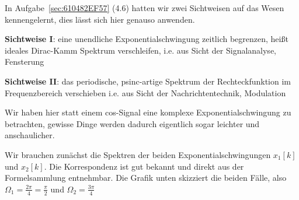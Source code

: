\begin{Ansatz}
In Aufgabe~\ref{sec:610482EF57} (4.6) hatten wir zwei Sichtweisen auf das Wesen kennengelernt, dies
lässt sich hier genauso anwenden.

\textbf{Sichtweise I}: eine unendliche Exponentialschwingung zeitlich
begrenzen, heißt ideales Dirac-Kamm Spektrum verschleifen,
i.e. aus Sicht der Signalanalyse, Fensterung

\textbf{Sichtweise II}: das periodische, psinc-artige Spektrum der Rechteckfunktion
im Frequenzbereich verschieben i.e. aus Sicht der Nachrichtentechnik, Modulation

Wir haben hier statt einem cos-Signal eine komplexe Exponentialschwingung
zu betrachten, gewisse Dinge werden dadurch eigentlich sogar leichter und anschaulicher.

Wir brauchen zunächst die Spektren der beiden Exponentialschwingungen $x_1[k]$
und $x_2[k]$.
Die Korrespondenz ist gut bekannt und direkt aus der Formelsammlung entnehmbar.
Die Grafik unten skizziert die beiden Fälle, also $\Omega_1=\frac{2\pi}{4} = \frac{\pi}{2}$
und $\Omega_2=\frac{3\pi}{4}$
\begin{center}
\end{center}
\end{Ansatz}
